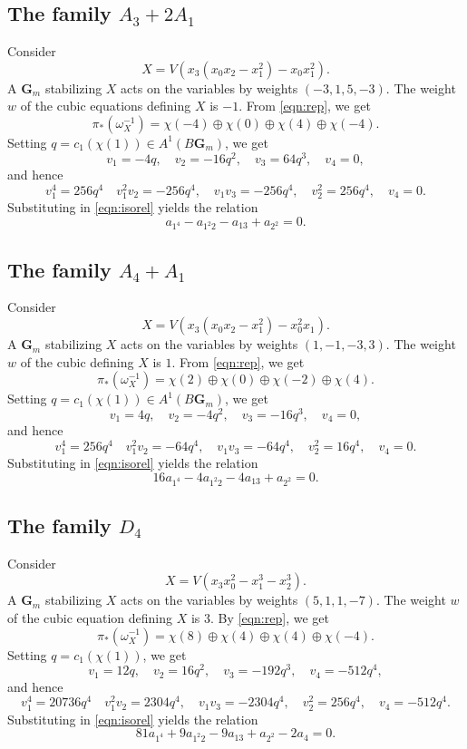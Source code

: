 \documentclass[reqno]{amsart}
\numberwithin{equation}{section}
\newcommand{\G}{\mathbf{G}}
\begin{document}
\subsection{The family $A_3 + 2A_1$}
Consider
\[ X = V(x_3(x_0x_2-x_1^2) - x_0x_1^2).\]
A $\G_m$ stabilizing $X$ acts on the variables by weights $(-3,1,5,-3)$.
The weight $w$ of the cubic equations defining $X$ is $-1$.
From \eqref{eqn:rep}, we get
\[ \pi_*\left( \omega_X^{-1} \right) = \chi(-4) \oplus \chi(0) \oplus \chi(4) \oplus \chi(-4).\]
Setting $q = c_1(\chi(1)) \in A^1(B\G_m)$, we get
\[ v_1 = -4q, \quad v_2 = -16q^2, \quad v_3 = 64q^3, \quad v_4 = 0,\]
and hence
\[ v_1^4 = 256q^4 \quad v_1^2v_2 = -256q^4, \quad v_1v_3 = -256q^4, \quad v_2^2 = 256q^4, \quad v_4 = 0.\]
Substituting in \eqref{eqn:isorel} yields the relation
\begin{equation}\label{eqn:iso2}
  a_{1^4} - a_{1^2 2}- a_{13} +  a_{2^2}  = 0.
\end{equation}

\subsection{The family $A_4 + A_1$}
Consider
\[ X = V(x_3(x_0x_2-x_1^2) - x_0^2x_1).\]
A $\G_m$ stabilizing $X$ acts on the variables by weights $(1,-1,-3,3)$.
The weight $w$ of the cubic defining $X$ is $1$.
From \eqref{eqn:rep}, we get
\[ \pi_*\left( \omega_X^{-1} \right) = \chi(2) \oplus \chi(0) \oplus \chi(-2) \oplus \chi(4).\]
Setting $q = c_1(\chi(1)) \in A^1(B\G_m)$, we get
\[ v_1 = 4q, \quad v_2 = -4q^2, \quad v_3 = -16q^3, \quad v_4 = 0,\]
and hence
\[ v_1^4 = 256q^4 \quad v_1^2v_2 = -64q^4, \quad v_1v_3 = -64q^4, \quad v_2^2 = 16q^4, \quad v_4 = 0.\]
Substituting in \eqref{eqn:isorel} yields the relation
\begin{equation}\label{eqn:iso3}
  16a_{1^4} -4a_{1^2 2}- 4a_{13} + a_{2^2}  = 0.
\end{equation}

\subsection{The family $D_4$}
Consider
\[ X = V(x_3x_0^2 - x_1^3-x_2^3).\]
A $\G_m$ stabilizing $X$ acts on the variables by weights $(5,1,1,-7)$.
The weight $w$ of the cubic equation defining $X$ is $3$.
By \eqref{eqn:rep}, we get
\[ \pi_*\left( \omega_X^{-1} \right) = \chi(8) \oplus \chi(4) \oplus \chi(4) \oplus \chi(-4).\]
Setting $q = c_1(\chi(1))$, we get
\[ v_1 = 12q, \quad v_2 = 16q^2, \quad v_3 = -192q^3, \quad v_4 = -512q^4,\]
and hence
\[ v_1^4 = 20736q^4 \quad v_1^2v_2 = 2304q^4, \quad v_1v_3 = -2304q^4, \quad v_2^2 = 256q^4, \quad v_4 = -512q^4.\]
Substituting in \eqref{eqn:isorel} yields the relation
\begin{equation}\label{eqn:iso4}
  81a_{1^4} +9a_{1^2 2}- 9a_{13} +  a_{2^2}-2a_4  = 0.
\end{equation}
\end{document}
